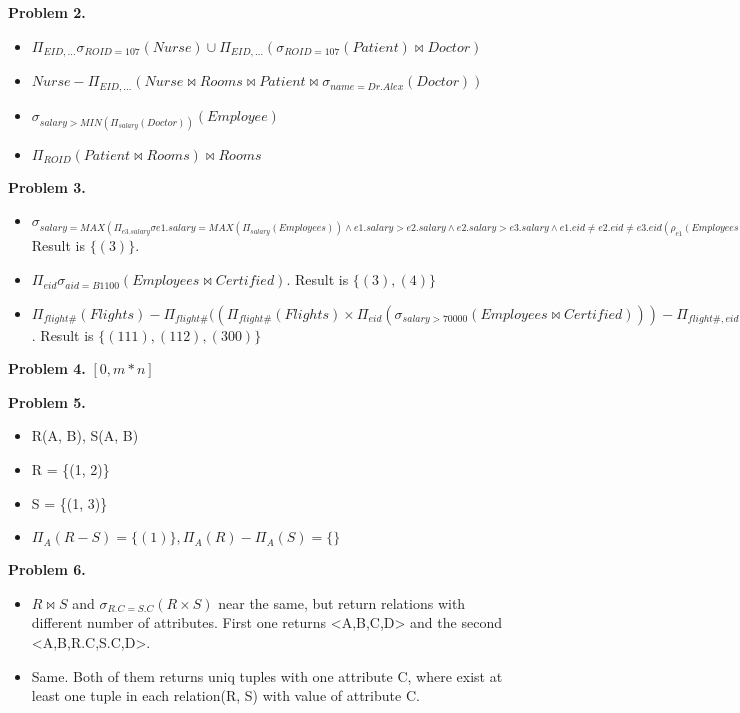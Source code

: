 \documentclass[a4paper,12pt]{article}
\newenvironment{problem}[1]{\par\bigskip\noindent\textbf{Problem #1.}
  \enskip\ignorespaces}{}
\begin{document}
  \begin{problem}{2}
    \begin{itemize}
      \item $\Pi_{EID, \ldots}\sigma_{ROID = 107}(Nurse) \cup \Pi_{EID, \ldots} (\sigma_{ROID=107}(Patient) \Join Doctor)$
      \item $Nurse - \Pi_{EID, \ldots}(Nurse \Join Rooms \Join Patient \Join \sigma_{name = Dr.Alex}(Doctor))$
      \item $\sigma_{salary > MIN(\Pi_{salary}(Doctor))}(Employee)$
      \item $\Pi_{ROID}(Patient \Join Rooms) \Join Rooms$
    \end{itemize}
  \end{problem}
  \begin{problem}{3}
    \begin{itemize}
      \item $\sigma_{salary=MAX(\Pi_{e3.salary}\sigma{e1.salary = MAX(\Pi_{salary}(Employees)) \wedge e1.salary > e2.salary \wedge e2.salary > e3.salary
      \wedge e1.eid \not= e2.eid \not= e3.eid}(\rho_{e1}(Employees) \times \rho_{e2}(Employees) \times \rho_{e3}(Employees)))}(Employees)$ Result is $\{(3)\}$. 

      \item $\Pi_{eid} \sigma_{aid = B1100}(Employees \Join Certified)$. Result is $\{(3), (4)\}$
      \item $\Pi_{flight\#}(Flights) - \Pi_{flight\#}( (\Pi_{flight\#}(Flights) \times \Pi_{eid} (\sigma_{salary > 70000}(Employees \Join Certified))) - \Pi_{flight\#, eid}(\sigma_{range \geq distance}(Aircraft \times Flights) \Join Certified)$. Result is $\{(111), (112), (300)\}$
    \end{itemize}
  \end{problem}

  \begin{problem}{4}
    $[0, m * n]$
  \end{problem}
  \begin{problem}{5}
    \begin{itemize}
      \item R(A, B), S(A, B)
      \item R = \{(1, 2)\}
      \item S = \{(1, 3)\}
      \item $\Pi_{A}(R-S) = \{(1)\}, \Pi_{A}(R) - \Pi_{A}(S) = \{\}$
    \end{itemize}
  \end{problem}
  \begin{problem}{6}
    \begin{itemize}
      \item $R \Join S$ and $\sigma_{R.C=S.C}(R \times S)$ near the same, but return relations with different number of attributes.
    First one returns <A,B,C,D> and the second <A,B,R.C,S.C,D>.
      \item Same. Both of them returns uniq tuples with one attribute C, where exist at least one tuple in each relation(R, S) with value of attribute C.
    \end{itemize}
  \end{problem}
\end{document}
